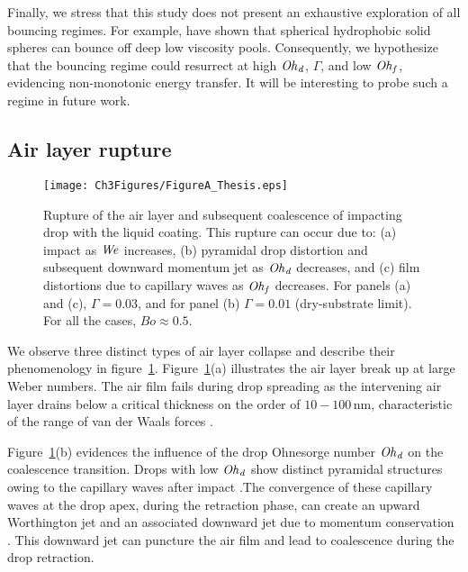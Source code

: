 Finally, we stress that this study does not present an exhaustive exploration of all bouncing regimes. For example, \citet{galeano2021capillary} have shown that spherical hydrophobic solid spheres can bounce off deep low viscosity pools. Consequently, we hypothesize that the bouncing regime could resurrect at high $\mathit{Oh}_\mathit{d}$, $\Gamma$, and low $\mathit{Oh}_\mathit{f}$, evidencing non-monotonic energy transfer. It will be interesting to probe such a regime in future work.


\begin{subappendices}
	\section{Air layer rupture}
	\label{App:FilmRupture}
	
	\begin{figure}
		\centering
		\texttt{[image: Ch3Figures/FigureA\_Thesis.eps]}
		\caption{Rupture of the air layer and subsequent coalescence of impacting drop with the liquid coating. This rupture can occur due to: (a) impact as $\mathit{We}$ increases, (b) pyramidal drop distortion and subsequent downward momentum jet as $\mathit{Oh}_\mathit{d}$ decreases, and (c) film distortions due to capillary waves as $\mathit{Oh}_\mathit{f}$ decreases. For panels (a) and (c), $\Gamma = 0.03$, and for panel (b) $\Gamma = 0.01$ (dry-substrate limit). For all the cases, $Bo \approx 0.5$.}
		\label{fig:figureA1}
	\end{figure}
	
	We observe three distinct types of air layer collapse and describe their phenomenology in figure~\ref{fig:figureA1}. 
	Figure~\ref{fig:figureA1}(a) illustrates the air layer break up at large Weber numbers. The air film fails during drop spreading as the intervening air layer drains below a critical thickness on the order of $10 - 100\,\si{\nano\meter}$, characteristic of the range of van der Waals forces \citep{charles1960coalescence, SprittlesPhysRevLett.124.084501, zhang2021thin}.
	
	Figure~\ref{fig:figureA1}(b) evidences the influence of the drop Ohnesorge number $\mathit{Oh}_\mathit{d}$ on the coalescence transition. Drops with low $\mathit{Oh}_\mathit{d}$ show distinct pyramidal structures owing to the capillary waves after impact \citep{renardy2003pyramidal}.The convergence of these capillary waves at the drop apex, during the retraction phase, can create an upward Worthington jet and an associated downward jet due to momentum conservation \citep{bartolo2006singular,lee2020downward,zhang2022impact}. This downward jet can puncture the air film and lead to coalescence during the drop retraction. 
	

\end{subappendices}

